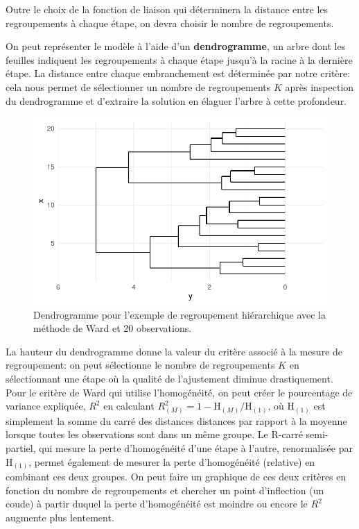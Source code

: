 \documentclass[
  11pt,
  letterpaper,
]{scrbook}
\theoremstyle{definition}
\theoremstyle{remark}
\begin{document}
Outre le choix de la fonction de liaison qui déterminera la distance
entre les regroupements à chaque étape, on devra choisir le nombre de
regroupements.

On peut représenter le modèle à l'aide d'un \textbf{dendrogramme}, un
arbre dont les feuilles indiquent les regroupements à chaque étape
jusqu'à la racine à la dernière étape. La distance entre chaque
embranchement est déterminée par notre critère: cela nous permet de
sélectionner un nombre de regroupements \(K\) après inspection du
dendrogramme et d'extraire la solution en élaguer l'arbre à cette
profondeur.

\begin{figure}[ht!]

{\centering \includegraphics{./03-regroupements_files/figure-pdf/fig-dendrogramme-1.pdf}

}

\caption{\label{fig-dendrogramme}Dendrogramme pour l'exemple de
regroupement hiérarchique avec la méthode de Ward et 20 observations.}

\end{figure}

La hauteur du dendrogramme donne la valeur du critère associé à la
mesure de regroupement: on peut sélectionne le nombre de regroupements
\(K\) en sélectionnant une étape où la qualité de l'ajustement diminue
drastiquement. Pour le critère de Ward qui utilise l'homogénéité, on
peut créer le pourcentage de variance expliquée, \(R^2\) en calculant
\(R^2_{(M)} = 1-\mathrm{H}_{(M)}/\mathrm{H}_{(1)}\), où
\(\mathrm{H}_{(1)}\) est simplement la somme du carré des distances
distances par rapport à la moyenne lorsque toutes les observations sont
dans un même groupe. Le R-carré semi-partiel, qui mesure la perte
d'homogénéité d'une étape à l'autre, renormalisée par
\(\mathrm{H}_{(1)}\), permet également de mesurer la perte d'homogénéité
(relative) en combinant ces deux groupes. On peut faire un graphique de
ces deux critères en fonction du nombre de regroupements et chercher un
point d'inflection (un coude) à partir duquel la perte d'homogénéité est
moindre ou encore le \(R^2\) augmente plus lentement.
\end{document}
